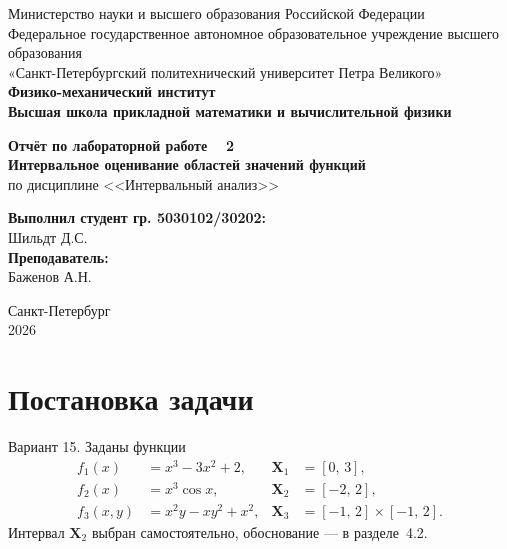 \documentclass[a4paper, 14pt]{extarticle}
\begin{document}
\begin{titlepage}
    \begin{center}
        Министерство науки и высшего образования Российской Федерации\\
        Федеральное государственное автономное образовательное учреждение высшего образования\\
        «Санкт-Петербургский политехнический университет Петра Великого»\\
        
        \textbf{Физико-механический институт}\\
        \textbf{Высшая школа прикладной математики и вычислительной физики}
    \end{center}

    \vfill
    
    \begin{center}
        \textbf{Отчёт по лабораторной работе \textnumero~ 2\\[0.5cm]}
        \textbf{Интервальное оценивание областей значений функций\\}
        по дисциплине <<Интервальный анализ>>
    \end{center}

    \vfill

    \hfill
    \begin{minipage}{0.45\textwidth}
        \textbf{Выполнил студент гр. 5030102/30202:}\\
        Шильдт Д.С.\\[0.5cm]
        \textbf{Преподаватель:}\\ 
        Баженов А.Н.
    \end{minipage}

    \vfill

    \begin{center}
        Санкт-Петербург\\2026
    \end{center}
\end{titlepage}

\setcounter{page}{2}

\tableofcontents
\newpage

\section{Постановка задачи}

Вариант 15. Заданы функции
\begin{align*}
    f_1(x) &= x^3 - 3x^2 + 2, & \mathbf{X}_1 &= [0,\,3],\\
    f_2(x) &= x^3\cos x, & \mathbf{X}_2 &= [-2,\,2],\\
    f_3(x, y) &= x^2 y - x y^2 + x^2, & \mathbf{X}_3 &= [-1,\,2]\times[-1,\,2].
\end{align*}
Интервал $\mathbf{X}_2$ выбран самостоятельно, обоснование --- в разделе~4.2.
\end{document}
